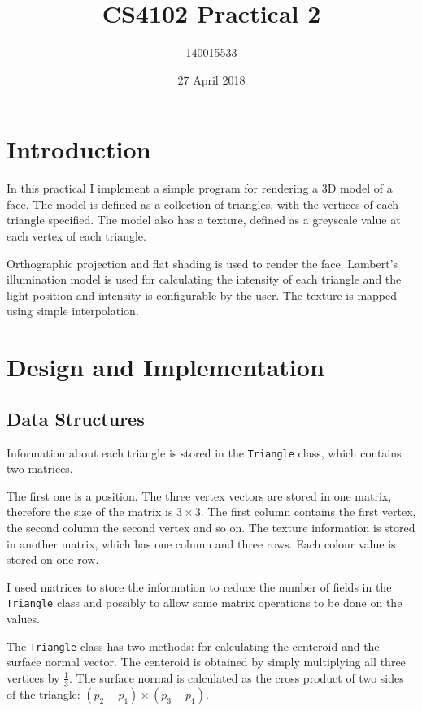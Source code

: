 \documentclass[]{article}
\title{CS4102 Practical 2}
\author{140015533}
\date{27 April 2018}
\begin{document}
\maketitle

\section{Introduction}

In this practical I implement a simple program for rendering a 3D model of a face. The model is defined as a collection of triangles, with the vertices of each triangle specified. The model also has a texture, defined as a greyscale value at each vertex of each triangle.

Orthographic projection and flat shading is used to render the face. Lambert's illumination model is used for calculating the intensity of each triangle and the light position and intensity is configurable by the user. The texture is mapped using simple interpolation.

\section{Design and Implementation}

\subsection{Data Structures}

Information about each triangle is stored in the \texttt{Triangle} class, which contains two matrices.

The first one is a position. The three vertex vectors are stored in one matrix, therefore the size of the matrix is $3 \times 3$. The first column contains the first vertex, the second column the second vertex and so on. The texture information is stored in another matrix, which has one column and three rows. Each colour value is stored on one row.

I used matrices to store the information to reduce the number of fields in the \texttt{Triangle} class and possibly to allow some matrix operations to be done on the values.

The \texttt{Triangle} class has two methods: for calculating the centeroid and the surface normal vector. The centeroid is obtained by simply multiplying all three vertices by $\frac{1}{3}$. The surface normal is calculated as the cross product of two sides of the triangle: $(p_2 - p_1) \times (p_3 - p_1)$.
\end{document}
